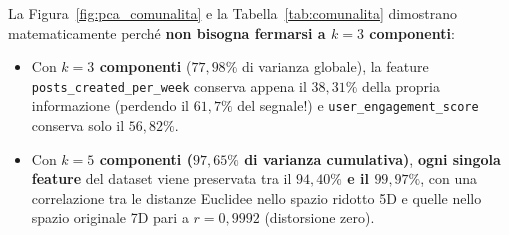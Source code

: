 \begin{table}[H]
\centering
\caption{Tabella di Comunalità: percentuale di varianza di ogni singola feature preservata al variare del numero di componenti principali $k$ mantenute.}
\label{tab:comunalita}
\end{table}

La Figura~\ref{fig:pca_comunalita} e la Tabella~\ref{tab:comunalita} dimostrano matematicamente perché \textbf{non bisogna fermarsi a $k=3$ componenti}:
\begin{itemize}
    \item Con \textbf{$k=3$ componenti} ($77,98\%$ di varianza globale), la feature \texttt{posts\_created\_per\_week} conserva appena il \textbf{$38,31\%$} della propria informazione (perdendo il $61,7\%$ del segnale!) e \texttt{user\_engagement\_score} conserva solo il \textbf{$56,82\%$}.
    \item Con \textbf{$k=5$ componenti ($97,65\%$ di varianza cumulativa)}, \textbf{ogni singola feature} del dataset viene preservata tra il \textbf{$94,40\%$ e il $99,97\%$}, con una correlazione tra le distanze Euclidee nello spazio ridotto 5D e quelle nello spazio originale 7D pari a \textbf{$r = 0,9992$} (distorsione zero).
\end{itemize}

